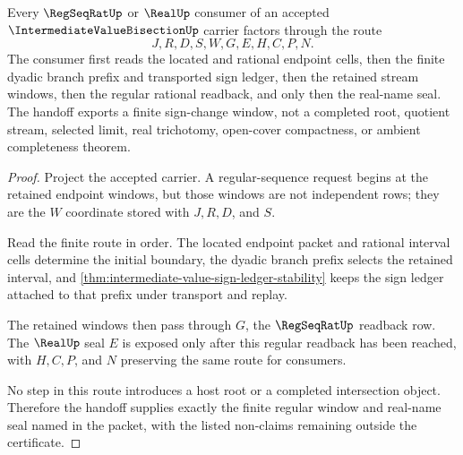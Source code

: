 \begin{theorem}
\label{thm:intermediate-value-regular-seal-handoff}
Every $\RegSeqRatUp$ or $\RealUp$ consumer of an accepted $\IntermediateValueBisectionUp$ carrier factors through the route
$$
J,R,D,S,W,G,E,H,C,P,N .
$$
The consumer first reads the located and rational endpoint cells, then the finite dyadic branch prefix and transported sign ledger, then the retained stream windows, then the regular rational readback, and only then the real-name seal. The handoff exports a finite sign-change window, not a completed root, quotient stream, selected limit, real trichotomy, open-cover compactness, or ambient completeness theorem.
\end{theorem}
\begin{proof}
Project the accepted carrier. A regular-sequence request begins at the retained endpoint windows, but those windows are not independent rows; they are the $W$ coordinate stored with $J,R,D$, and $S$.

Read the finite route in order. The located endpoint packet and rational interval cells determine the initial boundary, the dyadic branch prefix selects the retained interval, and \autoref{thm:intermediate-value-sign-ledger-stability} keeps the sign ledger attached to that prefix under transport and replay.

The retained windows then pass through $G$, the $\RegSeqRatUp$ readback row. The $\RealUp$ seal $E$ is exposed only after this regular readback has been reached, with $H,C,P$, and $N$ preserving the same route for consumers.

No step in this route introduces a host root or a completed intersection object. Therefore the handoff supplies exactly the finite regular window and real-name seal named in the packet, with the listed non-claims remaining outside the certificate.
\end{proof}


